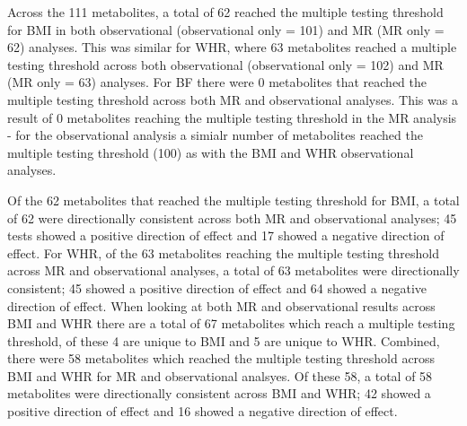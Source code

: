 \documentclass[11pt,twoside]{bristolthesis}
\begin{document}
Across the 111 metabolites, a total of 62 reached the multiple testing threshold for BMI in both observational (observational only = 101) and MR (MR only = 62) analyses. This was similar for WHR, where 63 metabolites reached a multiple testing threshold across both observational (observational only = 102) and MR (MR only = 63) analyses. For BF there were 0 metabolites that reached the multiple testing threshold across both MR and observational analyses. This was a result of 0 metabolites reaching the multiple testing threshold in the MR analysis - for the observational analysis a simialr number of metabolites reached the multiple testing threshold (100) as with the BMI and WHR observational analyses.

Of the 62 metabolites that reached the multiple testing threshold for BMI, a total of 62 were directionally consistent across both MR and observational analyses; 45 tests showed a positive direction of effect and 17 showed a negative direction of effect. For WHR, of the 63 metabolites reaching the multiple testing threshold across MR and observational analyses, a total of 63 metabolites were directionally consistent; 45 showed a positive direction of effect and 64 showed a negative direction of effect. When looking at both MR and observational results across BMI and WHR there are a total of 67 metabolites which reach a multiple testing threshold, of these 4 are unique to BMI and 5 are unique to WHR. Combined, there were 58 metabolites which reached the multiple testing threshold across BMI and WHR for MR and observational analsyes. Of these 58, a total of 58 metabolites were directionally consistent across BMI and WHR; 42 showed a positive direction of effect and 16 showed a negative direction of effect.
\end{document}
